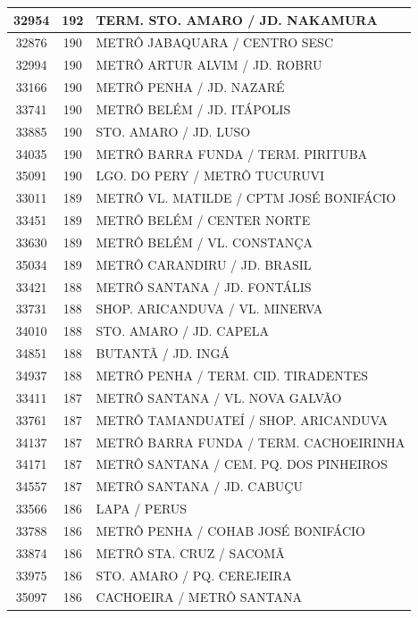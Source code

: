 \documentclass[
	12pt,				%
	oneside,			%
	a4paper,			%
	english,			%
	brazil				%
	]{abntex2ppgsi}
\begin{document}
{{\begin{apendicesenv}
\begin{longtable}{c|c|p{7cm}}
 \hline 
32954 &	192 &	TERM. STO. AMARO / JD. NAKAMURA \\ 
 \hline 
32876 &	190 &	METRÔ JABAQUARA / CENTRO SESC \\ 
 \hline 
32994 &	190 &	METRÔ ARTUR ALVIM / JD. ROBRU \\ 
 \hline 
33166 &	190 &	METRÔ PENHA / JD. NAZARÉ \\ 
 \hline 
33741 &	190 &	METRÔ BELÉM / JD. ITÁPOLIS \\ 
 \hline 
33885 &	190 &	STO. AMARO / JD. LUSO \\ 
 \hline 
34035 &	190 &	METRÔ BARRA FUNDA / TERM. PIRITUBA \\ 
 \hline 
35091 &	190 &	LGO. DO PERY / METRÔ TUCURUVI \\ 
 \hline 
33011 &	189 &	METRÔ VL. MATILDE / CPTM JOSÉ BONIFÁCIO \\ 
 \hline 
33451 &	189 &	METRÔ BELÉM / CENTER NORTE \\ 
 \hline 
33630 &	189 &	METRÔ BELÉM / VL. CONSTANÇA \\ 
 \hline 
35034 &	189 &	METRÔ CARANDIRU / JD. BRASIL \\ 
 \hline 
33421 &	188 &	METRÔ SANTANA / JD. FONTÁLIS \\ 
 \hline 
33731 &	188 &	SHOP. ARICANDUVA / VL. MINERVA \\ 
 \hline 
34010 &	188 &	STO. AMARO / JD. CAPELA \\ 
 \hline 
34851 &	188 &	BUTANTÃ / JD. INGÁ \\ 
 \hline 
34937 &	188 &	METRÔ PENHA / TERM. CID. TIRADENTES \\ 
 \hline 
33411 &	187 &	METRÔ SANTANA / VL. NOVA GALVÃO \\ 
 \hline 
33761 &	187 &	METRÔ TAMANDUATEÍ / SHOP. ARICANDUVA \\ 
 \hline 
34137 &	187 &	METRÔ BARRA FUNDA / TERM. CACHOEIRINHA \\ 
 \hline 
34171 &	187 &	METRÔ SANTANA / CEM. PQ. DOS PINHEIROS \\ 
 \hline 
34557 &	187 &	METRÔ SANTANA / JD. CABUÇU \\ 
 \hline 
33566 &	186 &	LAPA / PERUS \\ 
 \hline 
33788 &	186 &	METRÔ PENHA / COHAB JOSÉ BONIFÁCIO \\ 
 \hline 
33874 &	186 &	METRÔ STA. CRUZ / SACOMÃ \\ 
 \hline 
33975 &	186 &	STO. AMARO / PQ. CEREJEIRA \\ 
 \hline 
35097 &	186 &	CACHOEIRA / METRÔ SANTANA \\ 

\end{longtable}
\end{apendicesenv}}}
\end{document}
